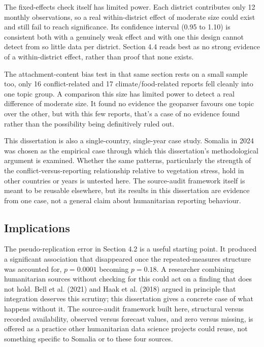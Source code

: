 \documentclass[12pt,a4paper]{article}
\begin{document}
The fixed-effects check itself has limited power. Each district contributes only 12 monthly observations, so a real within-district effect of moderate size could exist and still fail to reach significance. Its confidence interval (0.95 to 1.10) is consistent both with a genuinely weak effect and with one this design cannot detect from so little data per district. Section 4.4 reads best as no strong evidence of a within-district effect, rather than proof that none exists.

The attachment-content bias test in that same section rests on a small sample too, only 16 conflict-related and 17 climate/food-related reports fell cleanly into one topic group. A comparison this size has limited power to detect a real difference of moderate size. It found no evidence the geoparser favours one topic over the other, but with this few reports, that's a case of no evidence found rather than the possibility being definitively ruled out.

This dissertation is also a single-country, single-year case study. Somalia in 2024 was chosen as the empirical case through which this dissertation's methodological argument is examined. Whether the same patterns, particularly the strength of the conflict-versus-reporting relationship relative to vegetation stress, hold in other countries or years is untested here. The source-audit framework itself is meant to be reusable elsewhere, but its results in this dissertation are evidence from one case, not a general claim about humanitarian reporting behaviour.

\subsection{Implications}

The pseudo-replication error in Section 4.2 is a useful starting point. It produced a significant association that disappeared once the repeated-measures structure was accounted for, $p = 0.0001$ becoming $p = 0.18$. A researcher combining humanitarian sources without checking for this could act on a finding that does not hold. Bell et al. (2021) and Haak et al. (2018) argued in principle that integration deserves this scrutiny; this dissertation gives a concrete case of what happens without it. The source-audit framework built here, structural versus recorded availability, observed versus forecast values, and zero versus missing, is offered as a practice other humanitarian data science projects could reuse, not something specific to Somalia or to these four sources.
\end{document}
